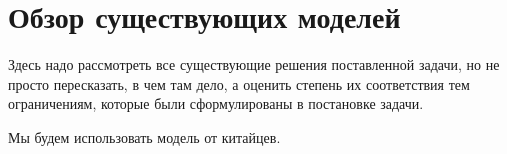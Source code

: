 \section{Обзор существующих моделей}
\label{sec:Chapter2} 
Здесь надо рассмотреть все существующие решения поставленной задачи, но не просто пересказать, в чем там дело, а оценить степень их соответствия тем ограничениям, которые были сформулированы в постановке задачи.

Мы будем использовать модель от китайцев. \cite{mmpose2020}

\newpage